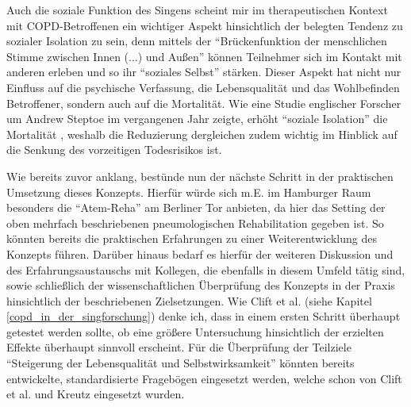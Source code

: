 Auch die soziale Funktion des Singens scheint mir im therapeutischen Kontext mit COPD-Betroffenen ein wichtiger Aspekt hinsichtlich der belegten Tendenz zu sozialer Isolation zu sein, denn mittels der "`Brückenfunktion der menschlichen Stimme zwischen Innen (...) und Außen"' \autocite[283]{deckervoigt2000} können Teilnehmer sich im Kontakt mit anderen erleben und so ihr "`soziales Selbst"' stärken. Dieser Aspekt hat nicht nur Einfluss auf die psychische Verfassung, die Lebensqualität und das Wohlbefinden Betroffener, sondern auch auf die Mortalität. Wie eine Studie englischer Forscher um Andrew Steptoe im vergangenen Jahr zeigte, erhöht "`soziale Isolation"' die Mortalität \autocite[vgl.][]{pmid23530191}, weshalb die Reduzierung dergleichen zudem wichtig im Hinblick auf die Senkung des vorzeitigen Todesrisikos ist.


Wie bereits zuvor anklang, bestünde nun der nächste Schritt in der praktischen Umsetzung dieses Konzepts. Hierfür würde sich m.E. im Hamburger Raum besonders die "`Atem-Reha"' am Berliner Tor anbieten, da hier das Setting der oben mehrfach beschriebenen pneumologischen Rehabilitation gegeben ist. So könnten bereits die praktischen Erfahrungen zu einer Weiterentwicklung des Konzepts führen. Darüber hinaus bedarf es hierfür der weiteren Diskussion und des Erfahrungsaustauschs mit Kollegen, die ebenfalls in diesem Umfeld tätig sind, sowie schließlich der wissenschaftlichen Überprüfung des Konzepts in der Praxis hinsichtlich der beschriebenen Zielsetzungen. Wie Clift et al. (siehe Kapitel \ref{copd_in_der_singforschung}) denke ich, dass in einem ersten Schritt überhaupt getestet werden sollte, ob eine größere Untersuchung hinsichtlich der erzielten Effekte überhaupt sinnvoll erscheint. Für die Überprüfung der Teilziele "`Steigerung der Lebensqualität und Selbstwirksamkeit"' könnten bereits entwickelte, standardisierte Fragebögen eingesetzt werden, welche schon von Clift et al. und Kreutz eingesetzt wurden.

